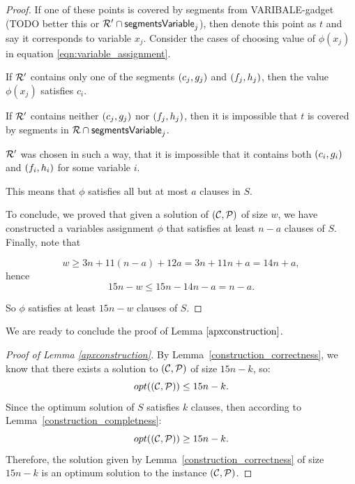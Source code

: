 \begin{proof}
If one of these points is covered by 
segments from VARIBALE-gadget (TODO better this or $\mathcal{R}' \cap \mathsf{segmentsVariable}_{j}$),
then denote this point as $t$ and say it corresponds to variable $x_j$.
Consider the cases of choosing value of $\phi(x_j)$
in equation \eqref{eqn:variable_assignment}.

If $\mathcal{R}'$ contains only one of the segments $(c_{j}, g_{j})$ and $(f_{j}, h_{j})$,
then the value $\phi(x_j)$ satisfies $c_i$.

If $\mathcal{R}'$ contains neither $(c_{j}, g_{j})$ nor $(f_{j}, h_{j})$,
then it is impossible that $t$ is covered by segments in $\mathcal{R} \cap \mathsf{segmentsVariable}_{j}$.

$\mathcal{R}'$ was chosen in such a way, that it is impossible that it contains
both $(c_{i}, g_{i})$ and $(f_{i}, h_{i})$ for some variable $i$.

This means that $\phi$ satisfies all but at most $a$ clauses in $S$.


To conclude, we proved that given a solution of $(\mathcal{C}, \mathcal{P})$ of size $w$,
we have constructed a variables assignment $\phi$
that satisfies at least $n-a$ clauses of $S$.
Finally, note that

$$w \ge 3n + 11(n-a) + 12a = 3n + 11n + a = 14n + a,$$
hence
$$15n - w  \le 15n - 14n - a = n - a.$$

So $\phi$ satisfies at least $15n-w$ clauses of $S$.
\end{proof}

We are ready to conclude the proof of Lemma $\ref{apxconstruction}$.

\begin{proof}[Proof of Lemma \ref{apxconstruction}]
By Lemma~\ref{construction_correctness}, we know
that there exists a solution to $(\mathcal{C}, \mathcal{P})$ of size $15n-k$, so: 
$$opt((\mathcal{C}, \mathcal{P})) \le 15n - k.$$
Since the optimum solution of $S$ satisfies $k$ clauses,
then according to Lemma~\ref{construction_completness}:
$$opt((\mathcal{C}, \mathcal{P})) \ge 15n -k.$$
Therefore, the solution given by Lemma~\ref{construction_correctness} 
of size $15n - k$ is an optimum solution to the instance $(\mathcal{C}, \mathcal{P})$.
\end{proof}

